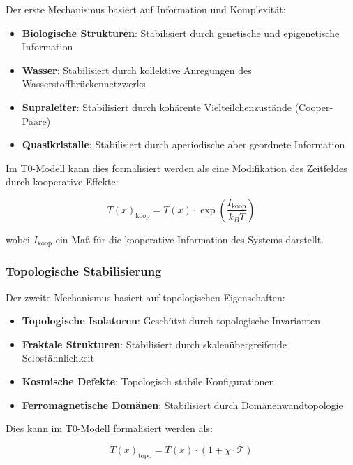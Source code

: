 \documentclass[12pt,a4paper]{article}
\newcommand{\Tfield}{T(x)}
\begin{document}
	Der erste Mechanismus basiert auf Information und Komplexität:
	
	\begin{itemize}
		\item \textbf{Biologische Strukturen}: Stabilisiert durch genetische und epigenetische Information
		\item \textbf{Wasser}: Stabilisiert durch kollektive Anregungen des Wasserstoffbrückennetzwerks
		\item \textbf{Supraleiter}: Stabilisiert durch kohärente Vielteilchenzustände (Cooper-Paare)
		\item \textbf{Quasikristalle}: Stabilisiert durch aperiodische aber geordnete Information
	\end{itemize}
	
	Im T0-Modell kann dies formalisiert werden als eine Modifikation des Zeitfeldes durch kooperative Effekte:
	
	\begin{equation}
		\Tfield_{\text{koop}} = \Tfield \cdot \exp\left(\frac{I_{\text{koop}}}{k_B T}\right)
	\end{equation}
	
	wobei $I_{\text{koop}}$ ein Maß für die kooperative Information des Systems darstellt.
	
	\subsubsection{Topologische Stabilisierung}
	
	Der zweite Mechanismus basiert auf topologischen Eigenschaften:
	
	\begin{itemize}
		\item \textbf{Topologische Isolatoren}: Geschützt durch topologische Invarianten
		\item \textbf{Fraktale Strukturen}: Stabilisiert durch skalenübergreifende Selbstähnlichkeit
		\item \textbf{Kosmische Defekte}: Topologisch stabile Konfigurationen
		\item \textbf{Ferromagnetische Domänen}: Stabilisiert durch Domänenwandtopologie
	\end{itemize}
	
	Dies kann im T0-Modell formalisiert werden als:
	
	\begin{equation}
		\Tfield_{\text{topo}} = \Tfield \cdot (1 + \chi \cdot \mathcal{T})
	\end{equation}
	
\end{document}
